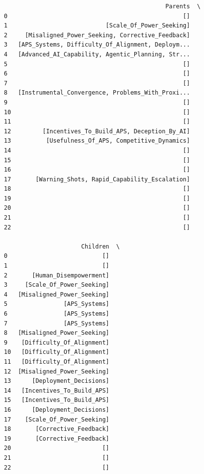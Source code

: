 \documentclass[
  11pt,
  letterpaper,
]{book}
\begin{document}
\begin{verbatim}
                                              Parents  \
0                                                  []   
1                            [Scale_Of_Power_Seeking]   
2     [Misaligned_Power_Seeking, Corrective_Feedback]   
3   [APS_Systems, Difficulty_Of_Alignment, Deploym...   
4   [Advanced_AI_Capability, Agentic_Planning, Str...   
5                                                  []   
6                                                  []   
7                                                  []   
8   [Instrumental_Convergence, Problems_With_Proxi...   
9                                                  []   
10                                                 []   
11                                                 []   
12         [Incentives_To_Build_APS, Deception_By_AI]   
13          [Usefulness_Of_APS, Competitive_Dynamics]   
14                                                 []   
15                                                 []   
16                                                 []   
17       [Warning_Shots, Rapid_Capability_Escalation]   
18                                                 []   
19                                                 []   
20                                                 []   
21                                                 []   
22                                                 []   

                      Children  \
0                           []   
1                           []   
2       [Human_Disempowerment]   
3     [Scale_Of_Power_Seeking]   
4   [Misaligned_Power_Seeking]   
5                [APS_Systems]   
6                [APS_Systems]   
7                [APS_Systems]   
8   [Misaligned_Power_Seeking]   
9    [Difficulty_Of_Alignment]   
10   [Difficulty_Of_Alignment]   
11   [Difficulty_Of_Alignment]   
12  [Misaligned_Power_Seeking]   
13      [Deployment_Decisions]   
14   [Incentives_To_Build_APS]   
15   [Incentives_To_Build_APS]   
16      [Deployment_Decisions]   
17    [Scale_Of_Power_Seeking]   
18       [Corrective_Feedback]   
19       [Corrective_Feedback]   
20                          []   
21                          []   
22                          []   


\end{verbatim}
\end{document}

